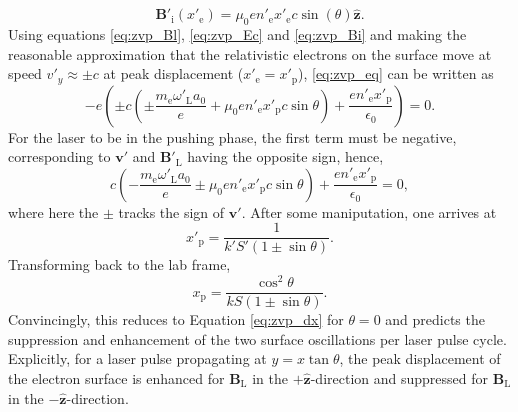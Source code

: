 \begin{equation}\label{eq:zvp_Bi}
	\mathbf{B}'_\mathrm{i}(x'_\mathrm{e}) = \mu_0 en'_\mathrm{e}x'_\mathrm{e}c\sin(\theta)\hat{\mathbf{z}}.
\end{equation}
Using equations \ref{eq:zvp_Bl}, \ref{eq:zvp_Ec} and \ref{eq:zvp_Bi} and making the reasonable approximation that the relativistic electrons on the surface move at speed $v'_y \approx \pm c$ at peak displacement ($x'_\mathrm{e} = x'_\mathrm{p}$), \ref{eq:zvp_eq} can be written as
\begin{equation}
	-e\left(\pm c\left(\pm\frac{m_\mathrm{e}\omega'_\mathrm{L}a_0}{e} + \mu_0 en'_\mathrm{e} x'_\mathrm{p}c\sin\theta\right)+\frac{en'_\mathrm{e}x'_\mathrm{p}}{\epsilon_0}\right) = 0.
\end{equation}
For the laser to be in the pushing phase, the first term must be negative, corresponding to $\mathbf{v'}$ and $\mathbf{B}'_\mathrm{L}$ having the opposite sign, hence,
\begin{equation}
	 c\left(-\frac{m_\mathrm{e}\omega'_\mathrm{L}a_0}{e} \pm \mu_0 en'_\mathrm{e} x'_\mathrm{p}c\sin\theta\right)+\frac{en'_\mathrm{e}x'_\mathrm{p}}{\epsilon_0} = 0,
\end{equation}
where here the $\pm$ tracks the sign of $\mathbf{v}'$. After some maniputation, one arrives at
\begin{equation}
	x'_\mathrm{p} = \frac{1}{k'S' (1\pm \sin\theta)}.
\end{equation}
Transforming back to the lab frame,
\begin{equation}
	x_\mathrm{p} = \frac{\cos^2\theta}{kS(1\pm \sin\theta)}.
\end{equation}
Convincingly, this reduces to Equation \ref{eq:zvp_dx} for $\theta =0$ and predicts the suppression and enhancement of the two surface oscillations per laser pulse cycle. Explicitly, for a laser pulse propagating at $y = x\tan\theta$, the peak displacement of the electron surface is enhanced for $\mathbf{B}_\mathrm{L}$ in the $+\hat{\mathbf{z}}$-direction and suppressed for $\mathbf{B}_\mathrm{L}$ in the $-\hat{\mathbf{z}}$-direction.

